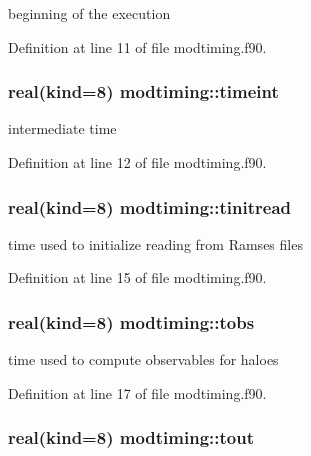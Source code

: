 beginning of the execution 



Definition at line 11 of file modtiming.\-f90.

\hypertarget{classmodtiming_a724cb127b8168bf0645e4070d83a34c0}{
\subsubsection[{timeint}]{\setlength{\rightskip}{0pt plus 5cm}real(kind=8) modtiming\-::timeint}}\label{classmodtiming_a724cb127b8168bf0645e4070d83a34c0}


intermediate time 



Definition at line 12 of file modtiming.\-f90.

\hypertarget{classmodtiming_a6c37469e0c299e5eb7c4b21eec1f2405}{
\subsubsection[{tinitread}]{\setlength{\rightskip}{0pt plus 5cm}real(kind=8) modtiming\-::tinitread}}\label{classmodtiming_a6c37469e0c299e5eb7c4b21eec1f2405}


time used to initialize reading from Ramses files 



Definition at line 15 of file modtiming.\-f90.

\hypertarget{classmodtiming_a83f5f02456356934410977b127c6308c}{
\subsubsection[{tobs}]{\setlength{\rightskip}{0pt plus 5cm}real(kind=8) modtiming\-::tobs}}\label{classmodtiming_a83f5f02456356934410977b127c6308c}


time used to compute observables for haloes 



Definition at line 17 of file modtiming.\-f90.

\hypertarget{classmodtiming_aad2ce715be55a32442a507f77e24f096}{
\subsubsection[{tout}]{\setlength{\rightskip}{0pt plus 5cm}real(kind=8) modtiming\-::tout}}\label{classmodtiming_aad2ce715be55a32442a507f77e24f096}


